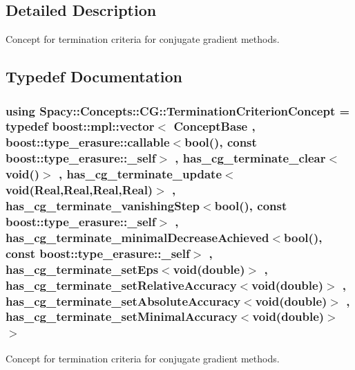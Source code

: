 \subsection{Detailed Description}
Concept for termination criteria for conjugate gradient methods. 



\subsection{Typedef Documentation}
\hypertarget{group__CGConceptGroup_ga6b30d103c365816efcfb038d922aef07_ga6b30d103c365816efcfb038d922aef07}{}
\subsubsection[{Termination\+Criterion\+Concept}]{\setlength{\rightskip}{0pt plus 5cm}using {\bf Spacy\+::\+Concepts\+::\+C\+G\+::\+Termination\+Criterion\+Concept} = typedef boost\+::mpl\+::vector$<$ Concept\+Base , boost\+::type\+\_\+erasure\+::callable$<$bool(), const boost\+::type\+\_\+erasure\+::\+\_\+self$>$ , has\+\_\+cg\+\_\+terminate\+\_\+clear$<$void()$>$ , has\+\_\+cg\+\_\+terminate\+\_\+update$<$void(Real,Real,Real,Real)$>$ , has\+\_\+cg\+\_\+terminate\+\_\+vanishing\+Step$<$bool(), const boost\+::type\+\_\+erasure\+::\+\_\+self$>$ , has\+\_\+cg\+\_\+terminate\+\_\+minimal\+Decrease\+Achieved$<$bool(), const boost\+::type\+\_\+erasure\+::\+\_\+self$>$ , has\+\_\+cg\+\_\+terminate\+\_\+set\+Eps$<$void(double)$>$ , has\+\_\+cg\+\_\+terminate\+\_\+set\+Relative\+Accuracy$<$void(double)$>$ , has\+\_\+cg\+\_\+terminate\+\_\+set\+Absolute\+Accuracy$<$void(double)$>$ , has\+\_\+cg\+\_\+terminate\+\_\+set\+Minimal\+Accuracy$<$void(double)$>$ $>$}\label{group__CGConceptGroup_ga6b30d103c365816efcfb038d922aef07_ga6b30d103c365816efcfb038d922aef07}


Concept for termination criteria for conjugate gradient methods. 

